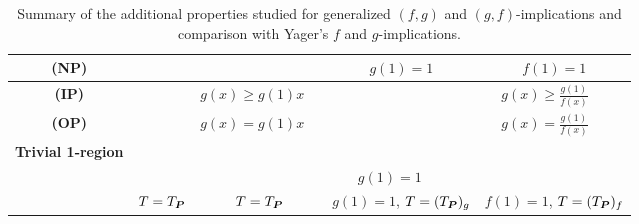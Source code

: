 \begin{table}[h]
\begin{adjustbox}{max width=\textwidth}
\begin{tabular}{c|cc|cc|cc|cc|}
				\multicolumn{1}{|c|}{\textbf{(NP)}}             & \multicolumn{2}{c|}{\cmark}                                                                            & \multicolumn{2}{c|}{\cmark}                                                        & \multicolumn{2}{c|}{$g(1)=1$}                       & \multicolumn{2}{c|}{$f(1)=1$}                                                    \\ \hline
				\multicolumn{1}{|c|}{\textbf{(IP)}}             & \multicolumn{2}{c|}{\xmark}                                                                             & \multicolumn{1}{c|}{$g(x) \geq g(1)x$}         & \xmark                    & \multicolumn{2}{c|}{\xmark}                             & \multicolumn{1}{c|}{$g(x) \geq \frac{g(1)}{f(x)}$}         & \xmark                   \\ \hline
				\multicolumn{1}{|c|}{\textbf{(OP)}}             & \multicolumn{2}{c|}{\xmark}                                                                             & \multicolumn{1}{c|}{$g(x)=g(1)x$}                          & \xmark                    & \multicolumn{2}{c|}{\xmark}                             & \multicolumn{1}{c|}{$g(x)=\frac{g(1)}{f(x)}$}             & \xmark                   \\ \hline
				\multicolumn{1}{|c|}{\textbf{Trivial 1-region}} & \multicolumn{2}{c|}{\cmark}                                                                            & \multicolumn{1}{c|}{\xmark}                                 & \cmark                   & \multicolumn{2}{c|}{\cmark}                            & \multicolumn{1}{c|}{\xmark}                                   & \cmark                  \\ \hline
				\multicolumn{1}{|c|}{\EP}             & \multicolumn{2}{c|}{\cmark}                                                                            & \multicolumn{2}{c|}{\cmark}                                                        & \multicolumn{1}{c|}{$g(1)=1$}         & \cmark           & \multicolumn{2}{c|}{\cmark}                                                         \\ \hline
				\multicolumn{1}{|c|}{\LI}             & \multicolumn{2}{c|}{$T=T_{\bm{P}}$}                                                                             & \multicolumn{2}{c|}{$T=T_{\bm{P}}$}                                                         & \multicolumn{2}{c|}{$g(1)=1$, $T=(T_{\bm{P}})_g$}            & \multicolumn{2}{c|}{$f(1)=1$, $T=(T_{\bm{P}})_f$}                                         \\ \hline
			\end{tabular}
	\end{adjustbox}
	\caption{Summary of the additional properties studied for generalized $(f,g)$ and $(g,f)$-implications and comparison with Yager's $f$ and $g$-implications.}\label{table:summary(f,g)(g,f)prop}
\end{table}

